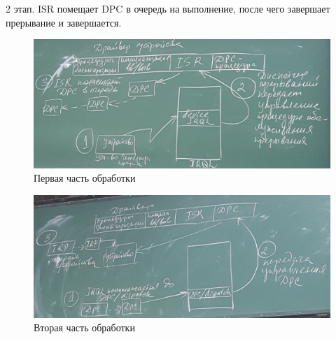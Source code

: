 2 этап. ISR помещает DPC в очередь на выполнение, после чего завершает прерывание и завершается.

\begin{figure}[H]
    \centering
    \includegraphics[width=\textwidth]{pic/8.png}
    \caption{Первая часть обработки}
\end{figure}

\begin{figure}[H]
    \centering
    \includegraphics[width=\textwidth]{pic/7.png}
    \caption{Вторая часть обработки}
\end{figure}

